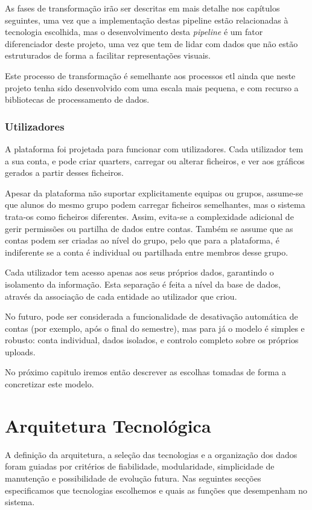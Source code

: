 As fases de transformação irão ser descritas em mais detalhe nos capítulos seguintes, uma vez que a implementação destas pipeline estão relacionadas à tecnologia escolhida, mas o desenvolvimento desta \textit{pipeline} é um fator diferenciador deste projeto, uma vez que tem de lidar com dados que não estão estruturados de forma a facilitar representações visuais. 

Este processo de transformação é semelhante aos processos \gls{etl} ainda que neste projeto tenha sido desenvolvido com uma escala mais pequena, e com recurso a bibliotecas de processamento de dados.

\subsubsection{Utilizadores}

A plataforma foi projetada para funcionar com utilizadores. Cada utilizador tem a sua conta, e pode criar quarters, carregar ou alterar ficheiros, e ver aos gráficos gerados a partir desses ficheiros.

Apesar da plataforma não suportar explicitamente equipas ou grupos, assume-se que alunos do mesmo grupo podem carregar ficheiros semelhantes, mas o sistema trata-os como ficheiros diferentes. Assim, evita-se a complexidade adicional de gerir permissões ou partilha de dados entre contas. Também se assume que as contas podem ser criadas ao nível do grupo, pelo que para a plataforma, é indiferente se a conta é individual ou partilhada entre membros desse grupo.

Cada utilizador tem acesso apenas aos seus próprios dados, garantindo o isolamento da informação. Esta separação é feita a nível da base de dados, através da associação de cada entidade ao utilizador que criou.

No futuro, pode ser considerada a funcionalidade de desativação automática de contas (por exemplo, após o final do semestre), mas para já o modelo é simples e robusto: conta individual, dados isolados, e controlo completo sobre os próprios uploads.

No próximo capitulo iremos então descrever as escolhas tomadas de forma a concretizar este modelo.

\section{Arquitetura Tecnológica}
\label{sec:tec}

A definição da arquitetura, a seleção das tecnologias e a organização dos dados foram guiadas por critérios de fiabilidade, modularidade, simplicidade de manutenção e possibilidade de evolução futura.  Nas seguintes secções especificamos que tecnologias escolhemos e quais as funções que desempenham no sistema.

